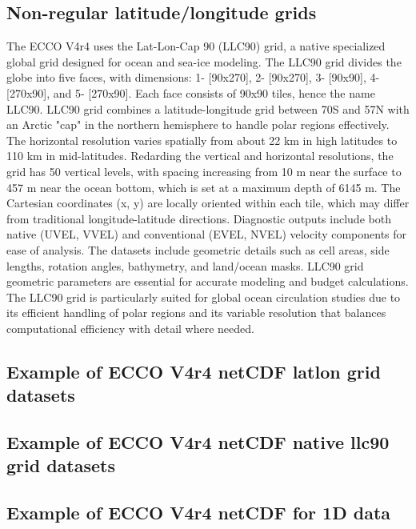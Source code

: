\subsection*{Non-regular latitude/longitude grids}
\par The ECCO V4r4 uses the Lat-Lon-Cap 90 (LLC90) grid, a native specialized global grid designed for ocean and sea-ice modeling. The LLC90 grid divides the globe into five faces, with dimensions: 1- [90x270], 2- [90x270], 3- [90x90], 4- [270x90], and 5- [270x90]. Each face consists of 90x90 tiles, hence the name LLC90. LLC90 grid combines a latitude-longitude grid between 70\textdegree S and 57\textdegree N with an Arctic "cap" in the northern hemisphere to handle polar regions effectively. The horizontal resolution varies spatially from about 22 km in high latitudes to 110 km in mid-latitudes. Redarding the vertical and horizontal resolutions, the grid has 50 vertical levels, with spacing increasing from 10 m near the surface to 457 m near the ocean bottom, which is set at a maximum depth of 6145 m. The Cartesian coordinates (x, y) are locally oriented within each tile, which may differ from traditional longitude-latitude directions. Diagnostic outputs include both native (UVEL, VVEL) and conventional (EVEL, NVEL) velocity components for ease of analysis. The datasets include geometric details such as cell areas, side lengths, rotation angles, bathymetry, and land/ocean masks. LLC90 grid geometric parameters are essential for accurate modeling and budget calculations. The LLC90 grid is particularly suited for global ocean circulation studies due to its efficient handling of polar regions and its variable resolution that balances computational efficiency with detail where needed.

\pagebreak
\subsection{Example of ECCO V4r4 netCDF latlon grid datasets}
\pagebreak
\subsection{Example of ECCO V4r4 netCDF native llc90 grid datasets}
\pagebreak
\subsection{Example of ECCO V4r4 netCDF for 1D data}


